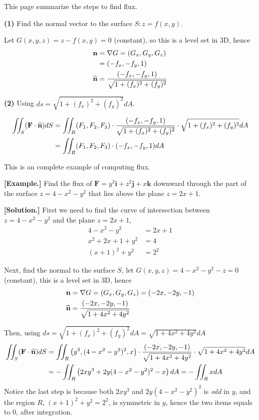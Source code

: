 \documentclass[11pt, a4paper]{MATH2023}
\newcommand{\eg}{\textbf{[Example.] }}
\newcommand{\sol}{\textbf{[Solution.] }}
\newcommand{\FF}{{\bf F}}
\begin{document}
\begin{spacing}{1.3}
    \newpage
    {\blue This page summarize the steps to find flux.}

    {\bf (1)} Find the normal vector to the surface $S: z=f(x,y)$.

    Let $G(x,y,z)=z-f(x,y)=0$ (constant), so this is a level set in 3D, hence 
    \begin{align*}
        {\bf n} &=\nabla G = (G_x, G_y, G_z)\\
                &= (-f_x, -f_y, 1)\\
        {\widehat{\bf{n}}}   &= \frac{(-f_x, -f_y, 1)}{\sqrt{1+(f_x)^2+(f_y)^2}}             
    \end{align*}

    {\bf (2)} Using $ds=\sqrt{1+(f_x)^2+(f_y)^2} dA$.

    \begin{align*}
        \iint_S(\FF\cdot \nm) dS &= \iint_R (F_1,F_2,F_3)\cdot 
                        \frac{(-f_x, -f_y, 1)}{\sqrt{1+(f_x)^2+(f_y)^2}} \cdot \sqrt{1+(f_x)^2+(f_y)^2} dA\\
                        &= \iint_R (F_1,F_2,F_3)\cdot (-f_x, -f_y, 1) dA
    \end{align*}

    \vspace{0.4in}
    {\blue This is an complete example of computing flux.}

    \eg Find the flux of $\mathbf{F}=y^{3} \mathbf{i}+z^{2} \mathbf{j}+x \mathbf{k}$ downward through 
    the part of the surface $z=4-x^{2}-y^{2}$ that lies above the plane $z=2 x+1$.
    
    \sol First we need to find the curve of intersection between 
    $z=4-x^2-y^2$ and the plane $z=2x+1$,
    \begin{align*}
        4-x^2-y^2 &= 2x+1\\
        x^2+2x+1+y^2 &= 4\\
        (x+1)^2+y^2 &= 2^2
    \end{align*}

    Next, find the normal to the surface $S$, let $G(x,y,z)=4-x^2-y^2-z=0$ (constant),
    this is a level set in 3D, hence 
    \begin{align*}
        {\bf n} &= \nabla G =(G_x, G_y, G_z) =(-2x, -2y, -1)\\
        {\widehat{\bf{n}} } &= \frac{(-2x, -2y, -1)}{\sqrt{1+4x^2+4y^2}}
    \end{align*}

    Then, using $ds=\sqrt{1+(f_x)^2+(f_y)^2} dA=\sqrt{1+4x^2+4y^2} dA$
    \begin{align*}
        \iint_S(\FF\cdot \nm) dS &= \iint_R \left(y^3, (4-x^2-y^2)^2, x\right)
            \cdot \frac{(-2x, -2y, -1)}{\sqrt{1+4x^2+4y^2}}\cdot \sqrt{1+4x^2+4y^2} dA\\
            &= -\iint_R \left(2xy^3+2y(4-x^2-y^2)^2-x\right) dA
            = -\iint_R x dA
    \end{align*}
    Notice the last step is because both $2xy^3$ and $2y(4-x^2-y^2)^2$ is {\it odd} in $y$,
    and the region $R$, $(x+1)^2+y^2 = 2^2$, is symmetric in $y$, hence the two items 
    equals to 0, after integration.


\end{spacing}
\end{document}
